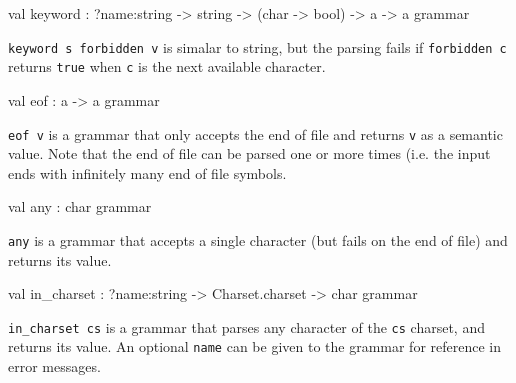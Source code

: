 \documentclass[11pt]{article}
\begin{document}
\label{val:Earley.keyword}\begin{ocamldoccode}
val keyword : ?name:string -> string -> (char -> bool) -> {\textquotesingle}a -> {\textquotesingle}a grammar
\end{ocamldoccode}
\begin{ocamldocdescription}
{\tt{keyword s forbidden v}} is simalar to string, but the parsing fails
    if {\tt{forbidden c}} returns {\tt{true}} when {\tt{c}} is the next available
    character.


\end{ocamldocdescription}




\label{val:Earley.eof}\begin{ocamldoccode}
val eof : {\textquotesingle}a -> {\textquotesingle}a grammar
\end{ocamldoccode}
\begin{ocamldocdescription}
{\tt{eof v}} is a grammar that only accepts the end of file  and  returns
    {\tt{v}} as a semantic value. Note that the end of file can be parsed one
    or more times (i.e. the input ends with infinitely many end of  file
    symbols.


\end{ocamldocdescription}




\label{val:Earley.any}\begin{ocamldoccode}
val any : char grammar
\end{ocamldoccode}
\begin{ocamldocdescription}
{\tt{any}} is a grammar that accepts a single character (but fails on the
    end of file) and returns its value.


\end{ocamldocdescription}




\label{val:Earley.in-underscorecharset}\begin{ocamldoccode}
val in_charset : ?name:string -> Charset.charset -> char grammar
\end{ocamldoccode}
\begin{ocamldocdescription}
{\tt{in\_charset cs}} is a grammar that parses any character of  the  {\tt{cs}}
    charset, and returns its value. An optional {\tt{name}} can be  given  to
    the grammar for reference in error messages.


\end{ocamldocdescription}
\end{document}
